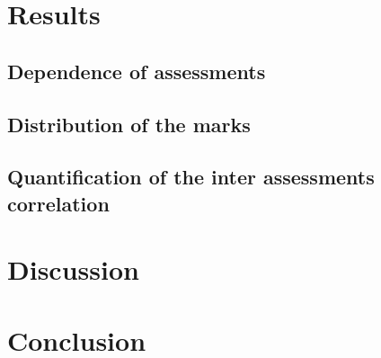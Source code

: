 \documentclass[a4paper]{article}
\begin{document}
\section{Results}
\subsection{Dependence of assessments}

\subsection{Distribution of the marks}
\subsection{Quantification of the inter assessments correlation}
\section{Discussion}
\section{Conclusion}
\end{document}
